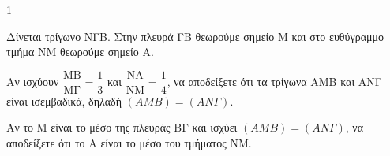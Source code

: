 \begin{ylh}{1}
    \item [Εκφώνηση που ανακατασκευάστηκε από την εικόνα της λύσης]
\end{ylh}
\begin{figure}
\vspace{-1cm}
\end{figure}
Δίνεται τρίγωνο ΝΓΒ. Στην πλευρά ΓΒ θεωρούμε σημείο Μ και στο ευθύγραμμο τμήμα ΝΜ θεωρούμε σημείο Α.
\begin{alist}
    \item Αν ισχύουν $\dfrac{\text{MB}}{\text{MΓ}} = \dfrac{1}{3}$ και $\dfrac{\text{NA}}{\text{NM}} = \dfrac{1}{4}$, να αποδείξετε ότι τα τρίγωνα ΑΜΒ και ΑΝΓ είναι ισεμβαδικά, δηλαδή $(ΑΜΒ) = (ΑΝΓ)$. 
    \item Αν το Μ είναι το μέσο της πλευράς ΒΓ και ισχύει $(ΑΜΒ) = (ΑΝΓ)$, να αποδείξετε ότι το Α είναι το μέσο του τμήματος ΝΜ. 
\end{alist}